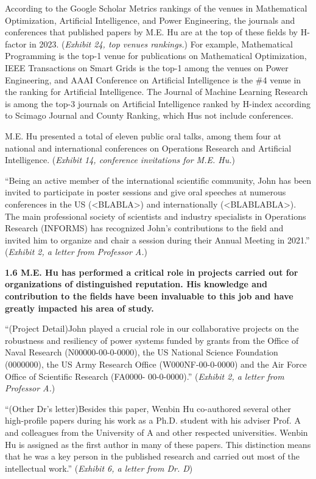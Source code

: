 \documentclass{article}
\begin{document}
According to the Google Scholar Metrics rankings of the venues in Mathematical Optimization, Artificial Intelligence, and Power Engineering, the journals and conferences that published papers by M.E. Hu are at the top of these fields by H-factor in 2023. ({\it Exhibit 24, top venues rankings.}) For example, Mathematical Programming is the top-1 venue for publications on Mathematical Optimization, IEEE Transactions on Smart Grids is the top-1 among the venues on Power Engineering, and AAAI Conference on Artificial Intelligence is the \#4 venue in the ranking for Artificial Intelligence. The Journal of Machine Learning Research is among the top-3 journals on Artificial Intelligence ranked by H-index according to Scimago Journal and County Ranking, which Hus not include conferences.

M.E. Hu presented a total of eleven public oral talks, among them four at national and international conferences on Operations Research and Artificial Intelligence. ({\it Exhibit 14, conference invitations for M.E. Hu.})

“Being an active member of the international scientific community, John has been invited to participate in poster sessions and give oral speeches at numerous conferences in the US (<BLABLA>) and internationally (<BLABLABLA>). The main professional society of scientists and industry specialists in Operations Research (INFORMS) has recognized John’s contributions to the field and invited him to organize and chair a session during their Annual Meeting in 2021.” ({\it Exhibit 2, a letter from Professor A.}) 

{\bf 1.6 M.E. Hu has performed a critical role in projects carried out for organizations of distinguished reputation. His knowledge and contribution to the fields have been invaluable to this job and have greatly impacted his area of study. }

“(Project Detail)John played a crucial role in our collaborative projects on the robustness and resiliency of power systems funded by grants from the Office of Naval Research (N00000-00-0-0000), the US National Science Foundation (0000000), the US Army Research Office (W000NF-00-0-0000) and the Air Force Office of Scientific Research (FA0000- 00-0-0000).” ({\it Exhibit 2, a letter from Professor A.}) 

“(Other Dr's letter)Besides this paper, Wenbin Hu co-authored several other high-profile papers during his work as a Ph.D. student with his adviser Prof. A and colleagues from the University of A and other respected universities. Wenbin Hu is assigned as the first author in many of these papers. This distinction means that he was a key person in the published research and carried out most of the intellectual work.” ({\it Exhibit 6, a letter from Dr. D}) 
\end{document}
